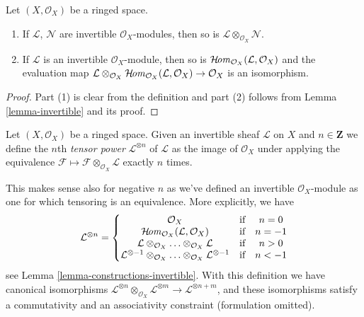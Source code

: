 \begin{lemma}
\label{lemma-constructions-invertible}
Let $(X, \mathcal{O}_X)$ be a ringed space.
\begin{enumerate}
\item If $\mathcal{L}$, $\mathcal{N}$ are invertible
$\mathcal{O}_X$-modules, then so is
$\mathcal{L} \otimes_{\mathcal{O}_X} \mathcal{N}$.
\item If $\mathcal{L}$ is an invertible $\mathcal{O}_X$-module, then so is
$\mathop{\mathcal{H}\!\mathit{om}}\nolimits_{\mathcal{O}_X}(\mathcal{L}, \mathcal{O}_X)$ and the evaluation map
$\mathcal{L} \otimes_{\mathcal{O}_X}
\mathop{\mathcal{H}\!\mathit{om}}\nolimits_{\mathcal{O}_X}(\mathcal{L}, \mathcal{O}_X) \to \mathcal{O}_X$
is an isomorphism.
\end{enumerate}
\end{lemma}

\begin{proof}
Part (1) is clear from the definition and part (2) follows from
Lemma \ref{lemma-invertible} and its proof.
\end{proof}

\begin{definition}
\label{definition-powers}
Let $(X, \mathcal{O}_X)$ be a ringed space. Given an invertible sheaf
$\mathcal{L}$ on $X$ and $n \in \mathbf{Z}$ we define the
$n$th {\it tensor power} $\mathcal{L}^{\otimes n}$ of $\mathcal{L}$
as the image of $\mathcal{O}_X$ under applying the equivalence
$\mathcal{F} \mapsto\mathcal{F} \otimes_{\mathcal{O}_X} \mathcal{L}$
exactly $n$ times.
\end{definition}

\noindent
This makes sense also for negative $n$ as we've defined an invertible
$\mathcal{O}_X$-module as one for which tensoring is an equivalence.
More explicitly, we have
$$
\mathcal{L}^{\otimes n} =
\left\{
\begin{matrix}
\mathcal{O}_X & \text{if} & n = 0 \\
\mathop{\mathcal{H}\!\mathit{om}}\nolimits_{\mathcal{O}_X}(\mathcal{L}, \mathcal{O}_X) & \text{if} & n = -1\\
\mathcal{L} \otimes_{\mathcal{O}_X} \ldots \otimes_{\mathcal{O}_X} \mathcal{L}
& \text{if} & n > 0 \\
\mathcal{L}^{\otimes -1} \otimes_{\mathcal{O}_X} \ldots
\otimes_{\mathcal{O}_X} \mathcal{L}^{\otimes -1}
& \text{if} & n < -1
\end{matrix}
\right.
$$
see Lemma \ref{lemma-constructions-invertible}.
With this definition we have canonical isomorphisms
$\mathcal{L}^{\otimes n} \otimes_{\mathcal{O}_X}
\mathcal{L}^{\otimes m} \to
\mathcal{L}^{\otimes n + m}$, and these isomorphisms
satisfy a commutativity and an associativity constraint
(formulation omitted).

